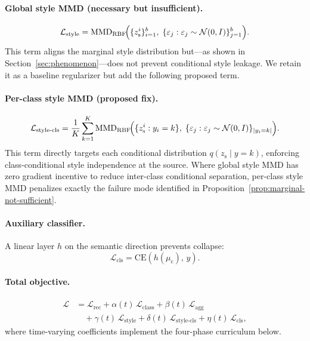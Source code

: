\documentclass[10pt]{article}
\newcommand{\zs}{z_{\mathrm{s}}}
\newcommand{\muc}{\mu_{\mathrm{c}}}
\newcommand{\MMD}{\mathrm{MMD}}
\newcommand{\CE}{\mathrm{CE}}
\begin{document}
\paragraph{Global style MMD (necessary but insufficient).}
\begin{equation}
  \mathcal{L}_{\mathrm{style}}
  = \MMD_{\mathrm{RBF}}\!\Bigl(\{\zs^i\}_{i=1}^{b},\;
    \{\varepsilon_j:\varepsilon_j\sim\mathcal{N}(0,I)\}_{j=1}^{b}\Bigr).
  \label{eq:style-mmd}
\end{equation}
This term aligns the marginal style distribution but---as shown in
Section~\ref{sec:phenomenon}---does not prevent conditional style leakage.
We retain it as a baseline regularizer but add the following proposed term.

\paragraph{Per-class style MMD (proposed fix).}
\begin{equation}
  \mathcal{L}_{\mathrm{style\text{-}cls}}
  = \frac{1}{K}\sum_{k=1}^{K}
    \MMD_{\mathrm{RBF}}\!\Bigl(
      \{\zs^i:y_i=k\},\;
      \{\varepsilon_j:\varepsilon_j\sim\mathcal{N}(0,I)\}_{|y_i=k|}
    \Bigr).
  \label{eq:style-cls-mmd}
\end{equation}
This term directly targets each conditional distribution $q(\zs\mid y{=}k)$,
enforcing class-conditional style independence at the source.
Where global style MMD has zero gradient incentive to reduce inter-class conditional
separation, per-class style MMD penalizes exactly the failure mode identified in
Proposition~\ref{prop:marginal-not-sufficient}.

\paragraph{Auxiliary classifier.}
A linear layer $h$ on the semantic direction prevents collapse:
\begin{equation}
  \mathcal{L}_{\mathrm{cls}} = \CE(h(\muc),\,y).
  \label{eq:cls}
\end{equation}

\paragraph{Total objective.}
\begin{align}
  \mathcal{L}
  &= \mathcal{L}_{\mathrm{rec}}
   + \alpha(t)\,\mathcal{L}_{\mathrm{class}}
   + \beta(t)\,\mathcal{L}_{\mathrm{agg}} \nonumber\\
  &\quad + \gamma(t)\,\mathcal{L}_{\mathrm{style}}
   + \delta(t)\,\mathcal{L}_{\mathrm{style\text{-}cls}}
   + \eta(t)\,\mathcal{L}_{\mathrm{cls}},
  \label{eq:total}
\end{align}
where time-varying coefficients implement the four-phase curriculum below.
\end{document}
